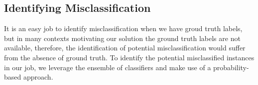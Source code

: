 \subsection{Identifying Misclassification}
It is an easy job to identify misclassification when we have groud truth labels, but in many contexts motivating
our solution the ground truth labels are not available, therefore, the identification of potential misclassification
would suffer from the absence of ground truth. To identify the potential misclassified instances in our job, we
leverage the ensemble of classifiers and make use of a probability-based approach.
